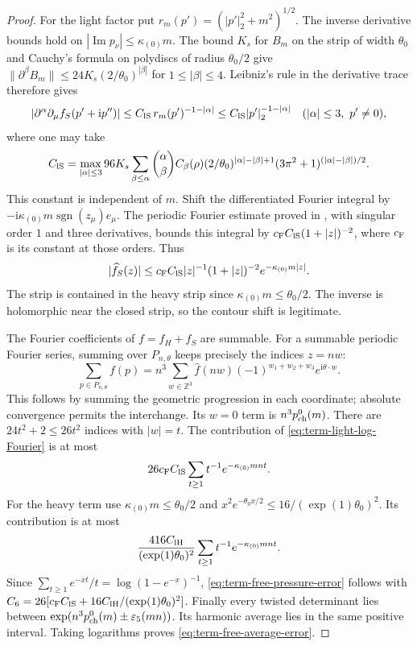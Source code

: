 \documentclass[11pt,letterpaper,reqno]{amsart}
\newcommand{\Z}{\mathbb Z}
\begin{document}
\begin{proof}
For the light factor put $r_m(p')=(|p'|_2^2+m^2)^{1/2}$.
The inverse derivative bounds
\cite[(15)]{FermionBlock} hold on
$|\operatorname{Im}p_\nu|\le\kappa_{(0)}m$.
The bound $K_s$ for $B_m$ on the strip of width $\theta_0$
and Cauchy's formula on polydiscs of radius $\theta_0/2$
give
$\|\partial^\beta B_m\|
\le24K_s(2/\theta_0)^{|\beta|}$ for $1\le|\beta|\le4$.
Leibniz's rule in the derivative trace therefore gives
\begin{equation}\label{eq:term-light-log-derivatives}
 |\partial^\alpha\partial_\mu f_S(p'+\mathrm ip'')|
 \le C_{\rm lS}\,r_m(p')^{-1-|\alpha|}
 \le C_{\rm lS}|p'|_2^{-1-|\alpha|}
       \quad(|\alpha|\le3,\ p'\ne0),
\end{equation}
where one may take
\[
 C_{\rm lS}
 =\max_{|\alpha|\le3}96K_s
   \sum_{\beta\le\alpha}
    \binom{\alpha}{\beta}C_\beta(\rho)
    (2/\theta_0)^{|\alpha|-|\beta|+1}
    (3\pi^2+1)^{(|\alpha|-|\beta|)/2}.
\]
This constant is independent of $m$.
Shift the differentiated Fourier integral by
$-\mathrm i\kappa_{(0)}m\operatorname{sgn}(z_\mu)e_\mu$.
The periodic Fourier estimate proved in
\cite[Proposition~2.3]{FermionBlock}, with singular
order $1$ and three derivatives, bounds this integral by
$c_{\rm F}C_{\rm lS}(1+|z|)^{-2}$, where $c_{\rm F}$
is its constant at those orders. Thus
\begin{equation}\label{eq:term-light-log-Fourier}
 |\widehat f_S(z)|
    \le c_{\rm F}C_{\rm lS}|z|^{-1}(1+|z|)^{-2}
                          e^{-\kappa_{(0)}m|z|}.
\end{equation}
The strip is contained in the heavy strip since
$\kappa_{(0)}m\le\theta_0/2$.
The inverse is holomorphic near the closed strip, so
the contour shift is legitimate.

The Fourier coefficients of $f=f_H+f_S$ are summable.
For a summable periodic Fourier series, summing over
$P_{n,\theta}$ keeps precisely the indices $z=nw$:
\begin{equation}\label{eq:term-Fourier-sampling}
 \sum_{p\in P_{n,\theta}}f(p)
 =n^3\sum_{w\in\Z^3}\widehat f(nw)
                       (-1)^{w_1+w_2+w_3}e^{\mathrm i\theta\cdot w}.
\end{equation}
This follows by summing the geometric progression in each
coordinate; absolute convergence permits the interchange.
Its $w=0$ term is $n^3p_{\rm ch}^0(m)$.
There are $24t^2+2\le26t^2$ indices with $|w|=t$.
The contribution of \eqref{eq:term-light-log-Fourier} is at most
\[
 26c_{\rm F}C_{\rm lS}
                  \sum_{t\ge1}t^{-1}e^{-\kappa_{(0)}mnt}.
\]
For the heavy term use
$\kappa_{(0)}m\le\theta_0/2$ and
$x^2e^{-\theta_0x/2}\le16/(\exp(1)\theta_0)^2$.
Its contribution is at most
\[
 \frac{416C_{\rm lH}}{(\exp(1)\theta_0)^2}
                     \sum_{t\ge1}t^{-1}e^{-\kappa_{(0)}mnt}.
\]
Since $\sum_{t\ge1}e^{-xt}/t=\log(1-e^{-x})^{-1}$,
\eqref{eq:term-free-pressure-error} follows with
$C_6=26[c_{\rm F}C_{\rm lS}
          +16C_{\rm lH}/(\exp(1)\theta_0)^2]$.
Finally every twisted determinant lies between
$\exp(n^3p_{\rm ch}^0(m)\pm\varepsilon_5(mn))$.
Its harmonic average lies in the same positive interval.
Taking logarithms proves \eqref{eq:term-free-average-error}.
\end{proof}
\end{document}
